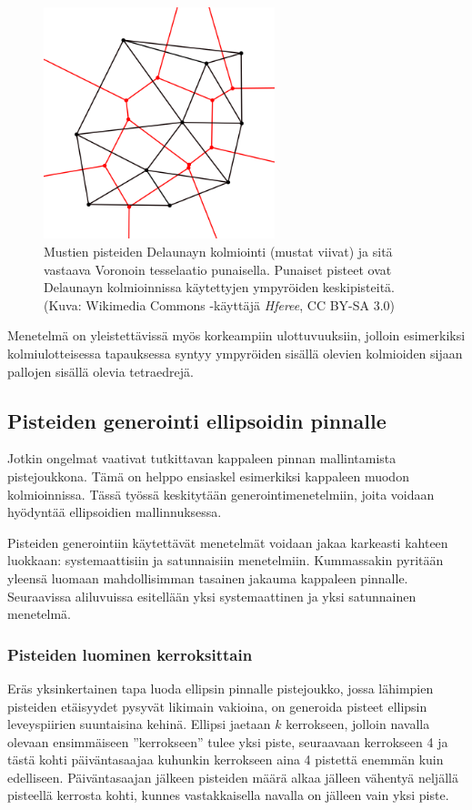 \documentclass[12pt,a4paper,titlepage]{article}
\begin{document}
\begin{figure}
  \centering
  \includegraphics[width=0.6\textwidth]{kuvat/voronoi.png}
  \caption{Mustien pisteiden Delaunayn kolmiointi (mustat viivat) ja sitä vastaava Voronoin tesselaatio punaisella. Punaiset pisteet ovat Delaunayn kolmioinnissa käytettyjen ympyröiden keskipisteitä. (Kuva: Wikimedia Commons -käyttäjä \textit{Hferee}, CC BY-SA 3.0)}
  \label{voronoi}
\end{figure}

Menetelmä on yleistettävissä myös korkeampiin ulottuvuuksiin, jolloin esimerkiksi kolmiulotteisessa tapauksessa syntyy ympyröiden sisällä olevien kolmioiden sijaan pallojen sisällä olevia tetraedrejä. \cite{maur2002delaunay}

\subsection{Pisteiden generointi ellipsoidin pinnalle}
Jotkin ongelmat vaativat tutkittavan kappaleen pinnan mallintamista pistejoukkona. Tämä on helppo ensiaskel esimerkiksi kappaleen muodon kolmioinnissa. Tässä työssä keskitytään generointimenetelmiin, joita voidaan hyödyntää ellipsoidien mallinnuksessa.

Pisteiden generointiin käytettävät menetelmät voidaan jakaa karkeasti kahteen luokkaan: systemaattisiin ja satunnaisiin menetelmiin. Kummassakin pyritään yleensä luomaan mahdollisimman tasainen jakauma kappaleen pinnalle. Seuraavissa aliluvuissa esitellään yksi systemaattinen ja yksi satunnainen menetelmä.

\subsubsection{Pisteiden luominen kerroksittain}
Eräs yksinkertainen tapa luoda ellipsin pinnalle pistejoukko, jossa lähimpien pisteiden etäisyydet pysyvät likimain vakioina, on generoida pisteet ellipsin leveyspiirien suuntaisina kehinä. Ellipsi jaetaan $k$ kerrokseen, jolloin navalla olevaan ensimmäiseen ''kerrokseen'' tulee yksi piste, seuraavaan kerrokseen 4 ja tästä kohti päiväntasaajaa kuhunkin kerrokseen aina 4 pistettä enemmän kuin edelliseen. Päiväntasaajan jälkeen pisteiden määrä alkaa jälleen vähentyä neljällä pisteellä kerrosta kohti, kunnes vastakkaisella navalla on jälleen vain yksi piste.
\end{document}
